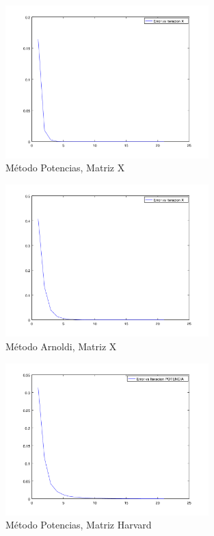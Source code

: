 \documentclass{article}
\begin{document}
\begin{figure}[p]
 \label{fig:arnoX}
  \caption{Método Potencias, Matriz X}
  \centering
    \includegraphics[width=0.7\textwidth]{ErrorVsIteracionPotencia-X.png}
\end{figure}

\begin{figure}[p]
  \caption{Método Arnoldi, Matriz X}
  \centering
    \includegraphics[width=0.7\textwidth]{ErrorVsIteracionArnoldi-X.png}
\end{figure}

\begin{figure}[p]
  \caption{Método Potencias, Matriz Harvard}
  \centering
    \includegraphics[width=0.7\textwidth]{ErrorVsIteracionPotencia-Harvard.png}
\end{figure}
\end{document}
